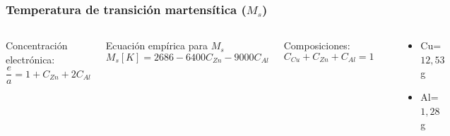 \documentclass[usenames,dvipsnames]{beamer}
\begin{document}
\begin{frame}

\frametitle{Temperatura de transición martensítica ($M_s$)}

\begin{columns}
\begin{block}{
Concentración electrónica:
}\begin{equation*}
\frac{e}{a} = 1+C_{Zn}+2C_{Al}
\end{equation*}
\end{block}
\begin{block}{
Ecuación empírica para $M_s$
} \begin{equation*}
M_s[K]=2686-6400C_{Zn}-9000C_{Al} \label{Ms} 
\end{equation*}
\end{block}
\begin{block}{
Composiciones:
}\begin{equation*}
     C_{Cu}+C_{Zn}+C_{Al}=1
\end{equation*}
\end{block}
\includegraphics[width=\columnwidth]{img/intro/MsZn2.eps}
\begin{tiny}
\begin{itemize}
 \item Cu= $12,53$ g
 \item Al= $1,28$ g
\end{itemize}
\end{tiny}

\end{columns}
\end{frame}
\end{document}
